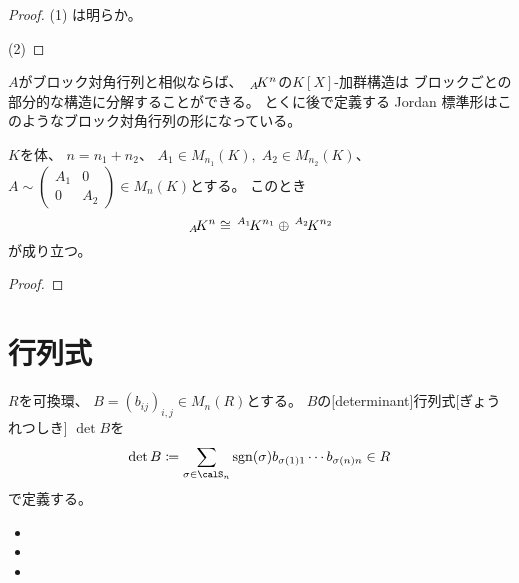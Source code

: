 \documentclass[report]{jlreq}
\begin{document}
\begin{proof}
    (1) は明らか。

    (2)
    \TODO{}
\end{proof}

$A$がブロック対角行列と相似ならば、
$\,{}_{A}\!K^n$の$K[X]$-加群構造は
ブロックごとの部分的な構造に分解することができる。
とくに後で定義する Jordan 標準形はこのようなブロック対角行列の形になっている。

\begin{lemma}
    $K$を体、
    $n = n_1 + n_2$、
    $A_1 \in M_{n_1}(K), \; A_2 \in M_{n_2}(K)$、
    $A \sim \begin{pmatrix}
        A_1 & 0 \\
        0 & A_2
    \end{pmatrix} \in M_n(K)$とする。
    このとき
    \begin{equation}
        \,{}_{A}\!K^n \cong \,{}^{A_1}\!K^{n_1} \oplus \,{}^{A_2}\!K^{n_2}
    \end{equation}
    が成り立つ。
\end{lemma}

\begin{proof}
    \TODO{}
\end{proof}

%
\section{行列式}

\begin{definition}[行列式]
    $R$を可換環、
    $B = (b_{ij})_{i, j} \in M_n(R)$とする。
    $B$の[determinant]{行列式}[ぎょうれつしき]
    $\det B$を
    \begin{equation}
        \det B \coloneqq
            \sum_{\sigma \in \calS_n} \sgn(\sigma)
            b_{\sigma(1)1} \cdots b_{\sigma(n)n}
            \in R
    \end{equation}
    で定義する。
\end{definition}

\begin{definition}[小行列式]
    \begin{itemize}
        \item {}
        \item {}
        \item {}
    \end{itemize}
\end{definition}
\end{document}

